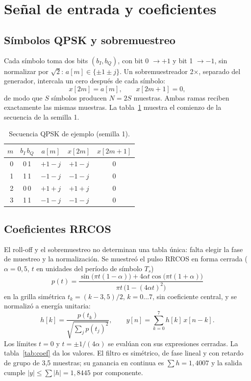 \section{Señal de entrada y coeficientes}\label{sec:senales}

\subsection{Símbolos QPSK y sobremuestreo}

Cada símbolo toma dos bits $(b_I, b_Q)$, con bit 0 $\to +1$ y bit 1 $\to -1$, sin normalizar por $\sqrt{2}$: $a[m] \in \{\pm1 \pm j\}$. Un sobremuestreador 2×, separado del generador, intercala un cero después de cada símbolo:
\begin{equation}
  x[2m] = a[m], \qquad x[2m+1] = 0,
\end{equation}
de modo que $S$ símbolos producen $N = 2S$ muestras. Ambas ramas reciben exactamente las mismas muestras. La tabla~\ref{tab:qpsk} muestra el comienzo de la secuencia de la semilla 1.

\begin{table}[h]
  \centering
  \caption{Secuencia QPSK de ejemplo (semilla 1).}\label{tab:qpsk}
  \begin{tabular}{rcccc}
    \toprule
    $m$ & $b_I\,b_Q$ & $a[m]$ & $x[2m]$ & $x[2m+1]$ \\
    \midrule
    0 & 0\,1 & $+1-j$ & $+1-j$ & 0 \\
    1 & 1\,1 & $-1-j$ & $-1-j$ & 0 \\
    2 & 0\,0 & $+1+j$ & $+1+j$ & 0 \\
    3 & 1\,1 & $-1-j$ & $-1-j$ & 0 \\
    \bottomrule
  \end{tabular}
\end{table}

\subsection{Coeficientes RRCOS}

El roll-off y el sobremuestreo no determinan una tabla única: falta elegir la fase de muestreo y la normalización. Se muestreó el pulso RRCOS en forma cerrada ($\alpha = 0{,}5$, $t$ en unidades del período de símbolo $T_s$)
\begin{equation}
  p(t) = \frac{\sin\!\big(\pi t(1-\alpha)\big) + 4\alpha t \cos\!\big(\pi t(1+\alpha)\big)}
              {\pi t\,\big(1 - (4\alpha t)^2\big)}
\end{equation}
en la grilla simétrica $t_k = (k - 3{,}5)/2$, $k = 0\ldots7$, sin coeficiente central, y se normalizó a energía unitaria:
\begin{equation}
  h[k] = \frac{p(t_k)}{\sqrt{\sum_j p(t_j)^2}}, \qquad
  y[n] = \sum_{k=0}^{7} h[k]\, x[n-k].
\end{equation}
Los límites $t = 0$ y $t = \pm 1/(4\alpha)$ se evalúan con sus expresiones cerradas. La tabla~\ref{tab:coef} da los valores. El filtro es simétrico, de fase lineal y con retardo de grupo de 3,5 muestras; su ganancia en continua es $\sum h = 1{,}4007$ y la salida cumple $|y| \le \sum|h| = 1{,}8445$ por componente.

